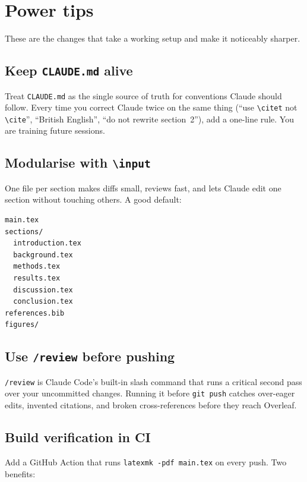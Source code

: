 \section{Power tips}
\label{sec:tips}

These are the changes that take a working setup and make it noticeably sharper.

\subsection{Keep \texttt{CLAUDE.md} alive}

\begin{tipbox}
Treat \verb|CLAUDE.md| as the single source of truth for conventions Claude should follow. Every time you correct Claude twice on the same thing (``use \verb|\citet| not \verb|\cite|'', ``British English'', ``do not rewrite section~2''), add a one-line rule. You are training future sessions.
\end{tipbox}

\subsection{Modularise with \texttt{\textbackslash input}}

One file per section makes diffs small, reviews fast, and lets Claude edit one section without touching others. A good default:

\begin{lstlisting}[style=tex]
main.tex
sections/
  introduction.tex
  background.tex
  methods.tex
  results.tex
  discussion.tex
  conclusion.tex
references.bib
figures/
\end{lstlisting}

\subsection{Use \texttt{/review} before pushing}

\verb|/review| is Claude Code's built-in slash command that runs a critical second pass over your uncommitted changes. Running it before \verb|git push| catches over-eager edits, invented citations, and broken cross-references before they reach Overleaf.

\subsection{Build verification in CI}

Add a GitHub Action that runs \verb|latexmk -pdf main.tex| on every push. Two benefits:

